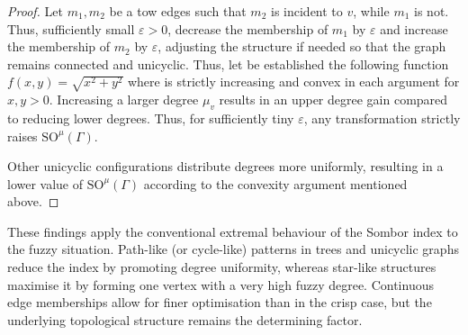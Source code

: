 \documentclass[12pt]{amsart}
\newcommand{\SOG}{\mathrm{SO}^{\mu}}
\begin{document}
\begin{proof}
Let $m_1,m_2$ be a tow edges such that $m_2$ is incident to $v$, while $m_1$ is not. Thus, sufficiently small $\varepsilon > 0$, decrease the membership of $m_1$ by $\varepsilon$ and increase the membership of $m_2$ by $\varepsilon$, adjusting the structure if needed so that the graph remains connected and unicyclic.
Thus, let be established the following function $f(x,y) = \sqrt{x^2 + y^2}$ where is strictly increasing and convex in each argument for $x,y > 0$. Increasing a larger degree $\mu_v$ results in an upper degree gain compared to reducing lower degrees. Thus, for sufficiently tiny $\varepsilon$, any transformation strictly raises $\SOG(\Gamma)$.

Other unicyclic configurations distribute degrees more uniformly, resulting in a lower value of $\SOG(\Gamma)$ according to the convexity argument mentioned above.
\end{proof}


These findings apply the conventional extremal behaviour of the Sombor index to the fuzzy situation. Path-like (or cycle-like) patterns in trees and unicyclic graphs reduce the index by promoting degree uniformity, whereas star-like structures maximise it by forming one vertex with a very high fuzzy degree. Continuous edge memberships allow for finer optimisation than in the crisp case, but the underlying topological structure remains the determining factor.
\end{document}
